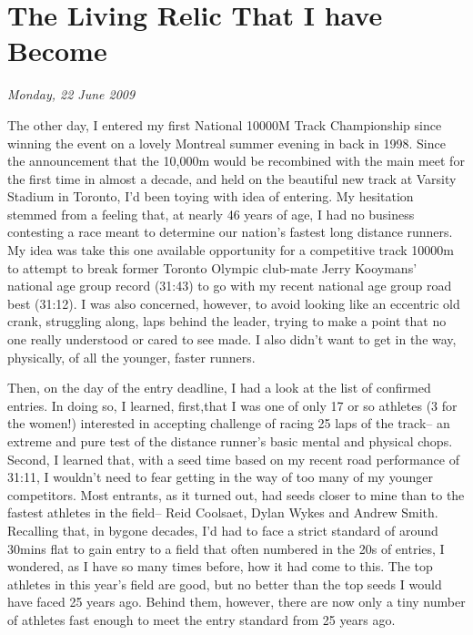 \chapter{The Living Relic That I have Become}
\textit{Monday, 22 June 2009}
\bigskip

The other day, I entered my first National 10000M Track Championship since winning the event on a lovely Montreal summer evening in back in 1998. Since the announcement that the 10,000m would be recombined with the main meet for the first time in almost a decade, and held on the beautiful new track at Varsity Stadium in Toronto, I'd been toying with idea of entering. My hesitation stemmed from a feeling that, at nearly 46 years of age, I had no business contesting a race meant to determine our nation's fastest long distance runners. My idea was take this one available opportunity for a competitive track 10000m to attempt to break former Toronto Olympic club-mate Jerry Kooymans' national age group record (31:43) to go with my recent national age group road best (31:12). I was also concerned, however, to avoid looking like an eccentric old crank, struggling along, laps behind the leader, trying to make a point that no one really understood or cared to see made. I also didn't want to get in the way, physically, of all the younger, faster runners.

Then, on the day of the entry deadline, I had a look at the list of confirmed entries. In doing so, I learned, first,that I was one of only 17 or so athletes (3 for the women!) interested in accepting challenge of racing 25 laps of the track-- an extreme and pure test of the distance runner's basic mental and physical chops. Second, I learned that, with a seed time based on my recent road performance of 31:11, I wouldn't need to fear getting in the way of too many of my younger competitors. Most entrants, as it turned out, had seeds closer to mine than to the fastest athletes in the field-- Reid Coolsaet, Dylan Wykes and Andrew Smith. Recalling that, in bygone decades, I'd had to face a strict standard of around 30mins flat to gain entry to a field that often numbered in the 20s of entries, I wondered, as I have so many times before, how it had come to this. The top athletes in this year's field are good, but no better than the top seeds I would have faced 25 years ago. Behind them, however, there are now only a tiny number of athletes fast enough to meet the entry standard from 25 years ago.

